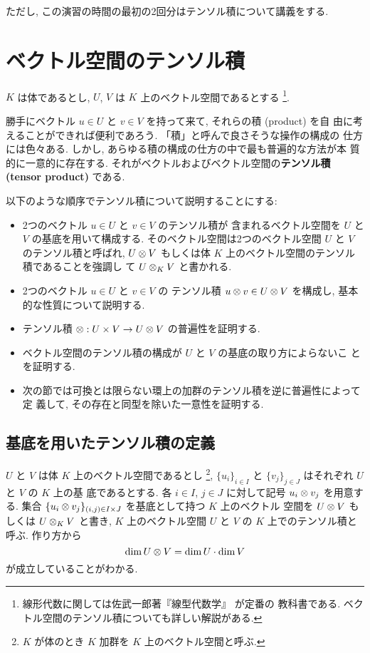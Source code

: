 \documentclass[12pt,twoside]{jarticle}
\begin{document}
ただし, この演習の時間の最初の2回分はテンソル積について講義をする.


\section{ベクトル空間のテンソル積}

$K$ は体であるとし, $U$, $V$ は $K$ 上のベクトル空間であるとする%
\footnote{線形代数に関しては佐武一郎著『線型代数学』 \cite{satake} が定番の
  教科書である.  ベクトル空間のテンソル積についても詳しい解説がある.}.

勝手にベクトル $u\in U$ と $v\in V$ を持って来て, それらの積 (product) を自
由に考えることができれば便利であろう.  「積」と呼んで良さそうな操作の構成の
仕方には色々ある.  しかし, あらゆる積の構成の仕方の中で最も普遍的な方法が本
質的に一意的に存在する.  
それがベクトルおよびベクトル空間の{\bf テンソル積(tensor product)} である.

以下のような順序でテンソル積について説明することにする:
\begin{itemize}
\item 2つのベクトル $u\in U$ と $v\in V$ のテンソル積が
  含まれるベクトル空間を $U$ と $V$ の基底を用いて構成する.
  そのベクトル空間は2つのベクトル空間 $U$ と $V$ のテンソル積と呼ばれ,
  $U\otimes V$ もしくは体 $K$ 上のベクトル空間のテンソル積であることを強調し
  て $U\otimes_K V$ と書かれる.
\item 2つのベクトル $u\in U$ と $v\in V$ の
  テンソル積 $u\otimes v\in U\otimes V$ を構成し, 基本的な性質について説明する.
\item テンソル積 $\otimes : U\times V \to U \otimes V$ の普遍性を証明する.
\item ベクトル空間のテンソル積の構成が $U$ と $V$ の基底の取り方によらないこ
  とを証明する.
\item 次の節では可換とは限らない環上の加群のテンソル積を逆に普遍性によって定
  義して, その存在と同型を除いた一意性を証明する.
\end{itemize}


\subsection{基底を用いたテンソル積の定義}

$U$ と $V$ は体 $K$ 上のベクトル空間であるとし%
\footnote{$K$ が体のとき $K$ 加群を $K$ 上のベクトル空間と呼ぶ.}, 
$\{u_i\}_{i\in I}$ と $\{v_j\}_{j\in J}$ はそれぞれ $U$ と $V$ の $K$ 上の基
底であるとする.  各 $i\in I$, $j\in J$ に対して記号 $u_i\otimes v_j$ を用意する.
集合 $\{u_i\otimes v_j\}_{(i,j)\in I\times J}$ を基底として持つ $K$ 上のベクトル
空間を $U\otimes V$ もしくは $U\otimes_K V$ と書き, 
$K$ 上のベクトル空間 $U$ と $V$ の $K$ 上でのテンソル積と呼ぶ. 作り方から
\begin{equation*}
  \dim U\otimes V = \dim U\cdot\dim V
\end{equation*}
が成立していることがわかる.
\end{document}
